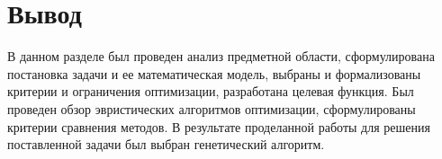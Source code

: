 \section{Вывод}
В данном разделе был проведен анализ предметной области, сформулирована постановка задачи и ее математическая модель, выбраны и формализованы  критерии и ограничения оптимизации, разработана целевая функция. Был проведен обзор эвристических алгоритмов оптимизации, сформулированы критерии сравнения методов. В результате проделанной работы для решения поставленной задачи был выбран генетический алгоритм.
